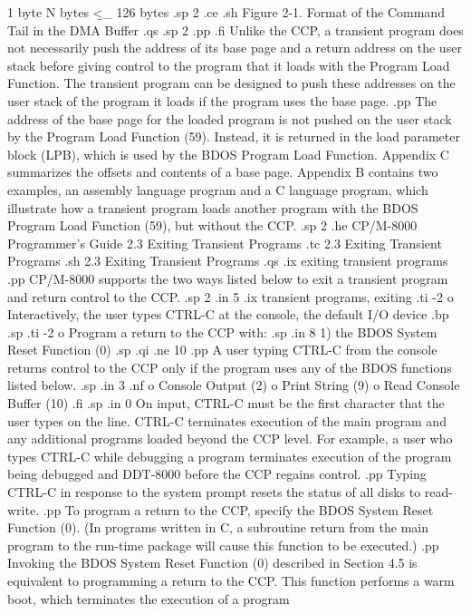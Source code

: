       1 byte             N bytes <\b_ 126 bytes
.sp 2
.ce
.sh
Figure 2-1.  Format of the Command Tail in the DMA Buffer
.qs
.sp 2
.pp
.fi
Unlike the CCP, a transient program does not necessarily push the address
of its base page and a return address on the user stack before giving
control to the program that it loads with the Program Load Function.  The
transient program can be designed to push these addresses on the user stack
of the program it loads if the program uses the base page. 
.pp
The address of the base page for the loaded program is not pushed on the
user stack by the Program Load Function (59).  Instead, it is returned in the 
load parameter block
(LPB), which is used by the BDOS Program Load Function.  Appendix 
C summarizes the offsets and contents of a base page.  Appendix B
contains two examples, an assembly language program and a
C language program, which illustrate how a transient program 
loads another program with the BDOS Program Load Function (59), 
but without the CCP.
.sp 2
.he CP/M-8000 Programmer's Guide       2.3  Exiting Transient Programs
.tc    2.3 Exiting Transient Programs
.sh
2.3 Exiting Transient Programs
.qs
.ix exiting transient programs
.pp 
CP/M-8000 supports the two ways listed below to exit a transient 
program and return control to the CCP. 
.sp 2
.in 5
.ix transient programs, exiting
.ti -2
o Interactively, the user types CTRL-C at the console, the default I/O 
device
.bp
.sp
.ti -2
o Program a return to the CCP with:
.sp
.in 8
1) the BDOS System Reset Function (0)
.sp
.qi
.ne 10
.pp
A user typing CTRL-C from the console returns control to the CCP
only if the program uses any of the BDOS functions listed below.
.sp
.in 3
.nf
o Console Output (2)
o Print String (9)
o Read Console Buffer (10)
.fi
.sp
.in 0
On input, CTRL-C must be the first character that the user types
on the line.  CTRL-C terminates execution of the main program and
any additional programs loaded beyond the CCP level.  For example, a user
who types CTRL-C while debugging a program terminates
execution of the program being debugged and DDT-8000 before the
CCP regains control. 
.pp
Typing CTRL-C in response to 
the system prompt resets the status of all disks to read-write. 
.pp
To program a return to the CCP, specify 
the BDOS System Reset Function (0).  (In programs written in C,
a subroutine return from the main program to the run-time package will cause
this function to be executed.)
.pp
Invoking the BDOS System Reset Function (0) described in Section 4.5 is 
equivalent to programming a return to the CCP.  This function
performs a warm boot, which terminates the execution of a program
